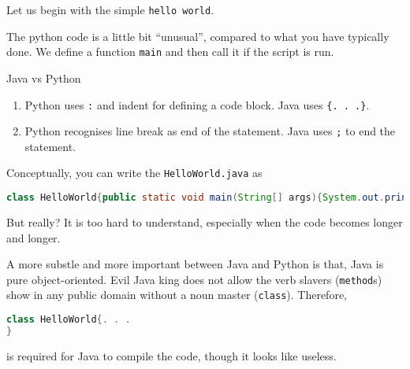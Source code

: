 \documentclass[a4paper]{article}
\newcommand{\pythonfile}[1]{}
\newcommand{\javafile}[1]{}
\begin{document}
Let us begin with the simple \verb|hello world|.
\pythonfile{../code/helloworld.py}
The python code is a little bit ``unusual'', compared to what you have typically done.  We define a function \verb|main| and then call it if the script is run. 

\javafile{../code/HelloWorld.java}

Java vs Python
\begin{enumerate}
    \item Python uses \verb|:| and indent for defining a code block. Java uses \verb|{. . .}|.
    \item Python recognises line break as end of the statement. Java uses \verb|;| to end the statement.
\end{enumerate}
Conceptually, you can write the \verb|HelloWorld.java| as
\begin{lstlisting}[language=Java, numbers=none]
class HelloWorld{public static void main(String[] args){System.out.println("Hello world");}}
\end{lstlisting}
But really? It is too hard to understand, especially when the code becomes longer and longer.

A more substle and more important between Java and Python is that, Java is pure object-oriented. Evil Java king does not allow the verb slavers (\verb|method|s) show in any public domain without a noun master (\verb|class|). Therefore, 
\begin{lstlisting}[language=Java, numbers=none]
class HelloWorld{. . .
}
\end{lstlisting}
is required for Java to compile the code, though it looks like useless.


\end{document}
